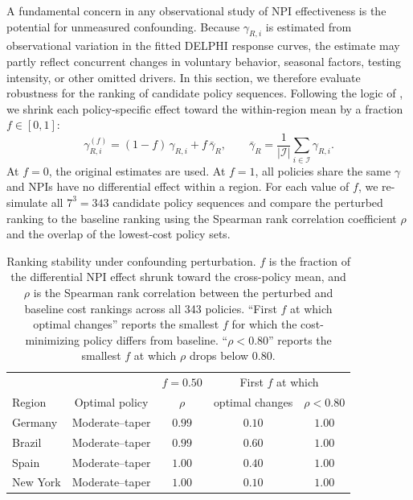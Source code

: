 \documentclass[msom,blindrev]{informs3} %
\newcommand{\rev}[1]{{\color{blue}#1}}
\begin{document}
\begin{APPENDICES}
{\color{blue}
A fundamental concern in any observational study of NPI effectiveness is the potential for unmeasured confounding. Because $\gamma_{R,i}$ is estimated from observational variation in the fitted DELPHI response curves, the estimate may partly reflect concurrent changes in voluntary behavior, seasonal factors, testing intensity, or other omitted drivers. In this section, we therefore evaluate robustness for the ranking of candidate policy sequences. Following the logic of , we shrink each policy-specific effect toward the within-region mean by a fraction $f \in [0,1]$:
\begin{equation}
    \gamma_{R,i}^{(f)} = (1-f)\,\gamma_{R,i} + f\,\bar{\gamma}_R, \qquad \bar{\gamma}_R = \frac{1}{|\mathcal{I}|}\sum_{i\in\mathcal{I}} \gamma_{R,i}. \label{eq:confounding_blend}
\end{equation}
At $f=0$, the original estimates are used. At $f=1$, all policies share the same $\gamma$ and NPIs have no differential effect within a region. For each value of $f$, we re-simulate all $7^3=343$ candidate policy sequences and compare the perturbed ranking to the baseline ranking using the Spearman rank correlation coefficient $\rho$ and the overlap of the lowest-cost policy sets.
}

\begin{table}[htbp!]
\centering
{\color{blue}
\begin{tabular}{|l|c|c|c|c|}
\hline
& & $f=0.50$ & \multicolumn{2}{c|}{First $f$ at which} \\
Region & Optimal policy & $\rho$ & optimal changes & $\rho < 0.80$ \\\hline
Germany & Moderate--taper & $0.99$ & $0.10$ & $1.00$ \\
Brazil  & Moderate--taper & $0.99$ & $0.60$ & $1.00$ \\
Spain   & Moderate--taper & $1.00$ & $0.40$ & $1.00$ \\
New York & Moderate--taper & $1.00$ & $0.10$ & $1.00$ \\\hline
\end{tabular}
}
\caption{\rev{Ranking stability under confounding perturbation. $f$ is the fraction of the differential NPI effect shrunk toward the cross-policy mean, and $\rho$ is the Spearman rank correlation between the perturbed and baseline cost rankings across all 343 policies. ``First $f$ at which optimal changes'' reports the smallest $f$ for which the cost-minimizing policy differs from baseline. ``$\rho < 0.80$'' reports the smallest $f$ at which $\rho$ drops below $0.80$.}}
\label{tab:ranking_stability}
\end{table}


\end{APPENDICES}
\end{document}
